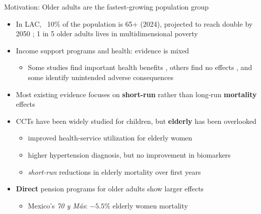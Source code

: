 \documentclass[aspectratio=169,usenames,dvipsnames]{beamer}
\newcommand{\smallcite}[1]{{\footnotesize\textcolor{Blue}{\citep{#1}}}}
\begin{document}
\begin{frame}{Motivation: Older adults are the fastest-growing population group}\label{motivation}
\vspace{2pt}
\small
\begin{itemize}
  \item[$\circ$] In LAC, ~10\% of the population is 65+ (2024), projected to reach double by 2050 \smallcite{UN2024WPP}; 1 in 5 older adults lives in multidimensional poverty \smallcite{CEPAL2024SocialPanorama}
  \item[$\circ$] Income support programs and health: evidence is mixed
    \begin{itemize}
      \item Some studies find important health benefits \smallcite{Case2004PerspectivesAging, Aguila2015PNAS}, others find no effects \smallcite{LloydSherlockAgrawal2014JDS}, and some identify unintended adverse consequences \smallcite{FernaldGertlerHou2008JN}
    \end{itemize}
  \vspace{4pt}
  \item[$\circ$] Most existing evidence focuses on \textbf{short-run} rather than long-run \textbf{mortality} effects
  \vspace{4pt}
  \item[$\circ$] CCTs have been widely studied for children, but \textbf{elderly} has been overlooked
    \begin{itemize}
      \item improved health-service utilization for elderly women \smallcite{BehrmanParker2013Demography}
      \item higher hypertension diagnosis, but no improvement in biomarkers \smallcite{aguila2024conditional}
      \item
      \textit{short-run} reductions in elderly mortality over first years \smallcite{BarhamRowberry2013JDE}
    \end{itemize}
  \vspace{4pt}
  \item[$\circ$] \textbf{Direct} pension programs for older adults show larger effects
    \begin{itemize}
      \item Mexico's \textit{70 y Más}: $-5.5\%$ elderly women mortality \smallcite{Menares2026JHR}
    \end{itemize}
\end{itemize}
\end{frame}
\end{document}
